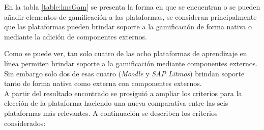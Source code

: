  \noindent En la tabla \ref{table:lmsGam} se presenta la forma en que se encuentran o se
 pueden añadir elementos de gamificación a las plataformas, se consideran principalmente
 que las plataformas pueden brindar soporte a la gamificación de forma nativa o mediante
 la adición de componentes externos.


 \noindent Como se puede ver, tan solo cuatro de las ocho plataformas de aprendizaje
 en línea permiten brindar soporte a la gamificación mediante componentes externos.
 Sin embargo solo dos de esas cuatro ({\it Moodle} y {\it SAP Litmos}) brindan soporte
 tanto de forma nativa como externa con componentes externos.\\

 \noindent A partir del resultado encontrado se prosiguió a ampliar los criterios para
 la elección de la plataforma haciendo una nueva comparativa entre las seis plataformas
 más relevantes. A continuación se describen los criterios considerados:

